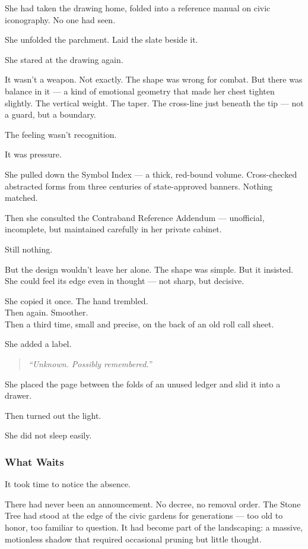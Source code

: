 \documentclass[12pt]{article}
\begin{document}
She had taken the drawing home, folded into a reference manual on civic iconography. No one had seen.

She unfolded the parchment. Laid the slate beside it.

She stared at the drawing again.

It wasn’t a weapon. Not exactly. The shape was wrong for combat. But there was balance in it --- a kind of emotional geometry that made her chest tighten slightly. The vertical weight. The taper. The cross-line just beneath the tip --- not a guard, but a boundary.

The feeling wasn’t recognition.

It was pressure.

She pulled down the Symbol Index --- a thick, red-bound volume. Cross-checked abstracted forms from three centuries of state-approved banners. Nothing matched.

Then she consulted the Contraband Reference Addendum --- unofficial, incomplete, but maintained carefully in her private cabinet.

Still nothing.

But the design wouldn't leave her alone. The shape was simple. But it insisted. She could feel its edge even in thought --- not sharp, but decisive.

She copied it once. The hand trembled.\\
Then again. Smoother.\\
Then a third time, small and precise, on the back of an old roll call sheet.

She added a label.

\begin{quote}
\textit{“Unknown. Possibly remembered.”}
\end{quote}

She placed the page between the folds of an unused ledger and slid it into a drawer.

Then turned out the light.

She did not sleep easily.

\dotfill

\subsubsection*{What Waits}

It took time to notice the absence.

There had never been an announcement. No decree, no removal order. The Stone Tree had stood at the edge of the civic gardens for generations --- too old to honor, too familiar to question. It had become part of the landscaping: a massive, motionless shadow that required occasional pruning but little thought.
\end{document}
